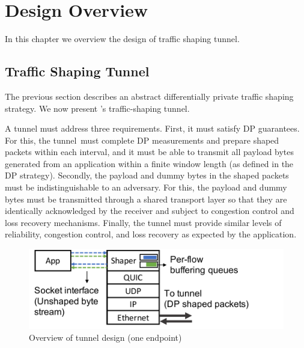 \chapter{Design Overview}\label{ch:design}
In this chapter we overview the design of {\sys} traffic shaping tunnel. 





\section{Traffic Shaping Tunnel}\label{sec:tunnel-overview}

The previous section describes an abstract differentially private traffic shaping strategy.
We now present \sys's traffic-shaping tunnel.

A tunnel must address three requirements. First, it must satisfy DP guarantees. For this, the tunnel~must complete DP measurements and prepare shaped packets within each interval, and it must be able to transmit all payload bytes generated from an application within a finite window length (as defined in the DP strategy).
%
Secondly, the payload and dummy bytes in the shaped packets must be indistinguishable to an adversary.
For this, the payload and dummy bytes must be transmitted through a shared transport layer so that they are identically acknowledged by the receiver and subject to congestion control and loss recovery mechanisms.
%
Finally, the tunnel must provide similar levels of reliability, congestion control, and loss recovery as expected by the application.
\begin{figure}[t]
  \centering
  \includegraphics[width=\columnwidth]{figures/design2.pdf}
  \caption{Overview of tunnel design (one endpoint)
  }
  \label{fig:minesvpn-overview}
\end{figure}

